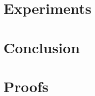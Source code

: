 \documentclass{article}
\begin{document}
\section{Experiments}

\section{Conclusion}

%
%





\clearpage
\onecolumn
\appendix
\section{Proofs}\label{app:proof}
\end{document}
